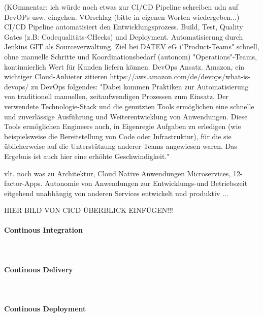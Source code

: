 (KOmmentar: ich würde noch etwas zur CI/CD Pipeline schreiben udn auf DevOPs usw. eingehen. VOrschlag (bitte in eigenen Worten wiedergeben...) 
 CI/CD Pipeline automatisiert den Entwicklungsprozess. 
Build, Test, Quality Gates (z.B: Codequalitäts-CHecks) und 
Deployment.  
Automatisierung durch Jenkins 
GIT als Sourceverwaltung.  
Ziel bei DATEV eG i"Product-Teams" 
schnell, ohne manuelle Schritte und Koordinationsbedarf (autonom) 
"Operations"-Teams, kontinuierlich Wert für Kunden liefern können. 
DevOps Ansatz. 
Amazon, ein wichtiger Cloud-Anbieter zitieren
https://aws.amazon.com/de/devops/what-is-devops/ zu DevOps folgendes: 
"Dabei kommen Praktiken zur Automatisierung von traditionell manuellen, zeitaufwendigen Prozessen zum Einsatz. Der verwendete Technologie-Stack und die genutzten Tools ermöglichen eine schnelle und zuverlässige Ausführung und Weiterentwicklung von Anwendungen. Diese Tools ermöglichen Engineers auch, in Eigenregie Aufgaben zu erledigen (wie beispielsweise die Bereitstellung von Code oder Infrastruktur), für die sie üblicherweise auf die Unterstützung anderer Teams angewiesen waren. Das Ergebnis ist auch hier eine erhöhte Geschwindigkeit."

vlt. noch was zu Architektur, Cloud Native Anwendungen
Microservices,  12-factor-Apps.
Autonomie von Anwendungen zur Entwicklungs-und Betriebszeit eitgehend unabhängig von anderen Services entwickelt und produktiv ...



HIER BILD VON CICD ÜBERBLICK EINFÜGEN!!!
\paragraph{\glqq Continous Integration\grqq}~\\
\cite{Laster.2017}

\paragraph{\glqq Continous Delivery\grqq}~\\
\cite{Laster.2017}

\paragraph{\glqq Continous Deployment\grqq}~\\
\cite{Laster.2017}




